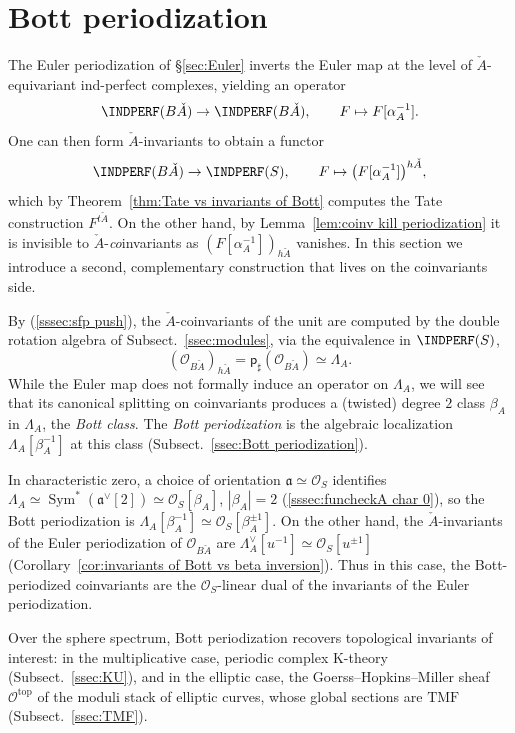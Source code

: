 \documentclass[12pt, oneside]{amsart}
\numberwithin{equation}{section}
\theoremstyle{remark}
\theoremstyle{plain}
\newcommand{\fra}{\mathfrak{a}}
\newcommand{\frav}{\mathfrak{a}^\vee}
\newcommand{\lam}{\Lambda}
\newcommand{\lamco}{\Lambda^\vee}
\newcommand{\OO}{\mathcal{O}}
\DeclareMathOperator{\Sym}{Sym}
\newcommand{\sfp}{\mathsf{p}}
\begin{document}
\section{Bott periodization}\label{sec:Bott per}

The Euler periodization of \S \ref{sec:Euler} inverts the Euler map at the level of $\check{A}$-equivariant ind-perfect complexes, yielding an operator
\[
  \INDPERF(B\check{A}) \to \INDPERF(B\check{A}), \qquad F \mapsto F[\alpha_A^{-1}].
\]
One can then form $\check{A}$-invariants to obtain a functor
\[
  \INDPERF(B\check{A}) \to \INDPERF(S), \qquad F \mapsto \bigl( F[\alpha_A^{-1}] \bigr)^{h\check{A}},
\]
which by Theorem~\ref{thm:Tate vs invariants of Bott} computes the Tate construction $F^{t\check{A}}$.
On the other hand, by Lemma~\ref{lem:coinv kill periodization} it is invisible to $\check{A}$-\emph{co}invariants as $(F[\alpha_A^{-1}])_{h\check{A}}$ vanishes.
In this section we introduce a second, complementary construction that lives on the coinvariants side.

By (\ref{sssec:sfp push}), the $\check{A}$-coinvariants of the unit are computed by the double rotation algebra of Subsect.~\ref{ssec:modules}, via the equivalence in $\INDPERF(S)$,
\[
  (\OO_{B\check{A}})_{h\check{A}} = \sfp_{\sharp}(\OO_{B\check{A}}) \simeq \lam_A.
\]
While the Euler map does not formally induce an operator on $\lam_A$, we will see that its canonical splitting on coinvariants produces a (twisted) degree $2$ class $\beta_A$ in $\lam_A$, the \emph{Bott class}.
The \emph{Bott periodization} is the algebraic localization $\lam_A[\beta_A^{-1}]$ at this class (Subsect.~\ref{ssec:Bott periodization}).

In characteristic zero, a choice of orientation $\fra \simeq \OO_S$ identifies $\lam_A \simeq \Sym^*(\frav[2]) \simeq \OO_S[\beta_A]$, $|\beta_A| = 2$ (\ref{sssec:funcheckA char 0}), so the Bott periodization is $\lam_A[\beta_A^{-1}] \simeq \OO_S[\beta_A^{\pm 1}]$.
On the other hand, the $\check{A}$-invariants of the Euler periodization of $\OO_{B\check{A}}$ are $\lamco_A[u^{-1}] \simeq \OO_S[u^{\pm 1}]$ (Corollary~\ref{cor:invariants of Bott vs beta inversion}).
Thus in this case, the Bott-periodized coinvariants are the $\OO_S$-linear dual of the invariants of the Euler periodization.

Over the sphere spectrum, Bott periodization recovers topological invariants of interest: in the multiplicative case, periodic complex K-theory (Subsect.~\ref{ssec:KU}), and in the elliptic case, the Goerss--Hopkins--Miller sheaf $\OO^{\mathrm{top}}$ of the moduli stack of elliptic curves, whose global sections are $\mathrm{TMF}$ (Subsect.~\ref{ssec:TMF}).
\end{document}
